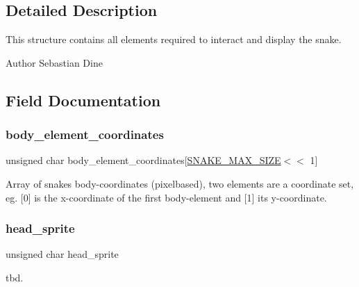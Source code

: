 \subsection{Detailed Description}
This structure contains all elements required to interact and display the snake. 

\begin{DoxyAuthor}{Author}
Sebastian Dine 
\end{DoxyAuthor}


\subsection{Field Documentation}
\hypertarget{structsnake__struct_a951e67290252c2a8d5ed463ce30d2743}{}\label{structsnake__struct_a951e67290252c2a8d5ed463ce30d2743} 
\subsubsection{\texorpdfstring{body\+\_\+element\+\_\+coordinates}{body\_element\_coordinates}}
{\footnotesize\ttfamily unsigned char body\+\_\+element\+\_\+coordinates\mbox{[}\hyperlink{macros_8h_a6fb1d4c78b46a621cb8344c51adcdc02}{S\+N\+A\+K\+E\+\_\+\+M\+A\+X\+\_\+\+S\+I\+ZE}$<$$<$ 1\mbox{]}}

Array of snakes body-\/coordinates (pixelbased), two elements are a coordinate set, eg. \mbox{[}0\mbox{]} is the x-\/coordinate of the first body-\/element and \mbox{[}1\mbox{]} its y-\/coordinate. \hypertarget{structsnake__struct_afebbff4a86a6b768aa89eb81da9b0611}{}\label{structsnake__struct_afebbff4a86a6b768aa89eb81da9b0611} 
\subsubsection{\texorpdfstring{head\+\_\+sprite}{head\_sprite}}
{\footnotesize\ttfamily unsigned char head\+\_\+sprite}

tbd. \hypertarget{structsnake__struct_aee3e536edc6d71b7578c751509573500}{}\label{structsnake__struct_aee3e536edc6d71b7578c751509573500} 
